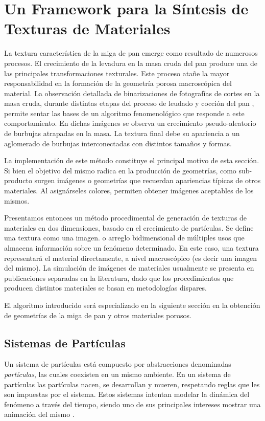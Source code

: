 \section[Síntesis de Texturas de Materiales]{Un Framework para la Síntesis de Texturas de Materiales}

La textura característica de la miga de pan emerge como resultado de numerosos procesos.
El crecimiento de la levadura en la masa cruda del pan produce una de las principales transformaciones texturales.
Este proceso atañe la mayor responsabilidad en la formación de la geometría porosa macroscópica del material.
La observación detallada de binarizaciones de fotografías de cortes en la masa cruda, durante distintas etapas del proceso de leudado y cocción del pan \cite{Scanlon2001}, permite sentar las bases de un algoritmo fenomenológico que responde a este comportamiento.
En dichas imágenes se observa un crecimiento pseudo-aleatorio de burbujas atrapadas en la masa.
La textura final debe su apariencia a un aglomerado de burbujas interconectadas con distintos tamaños y formas.

La implementación de este método constituye el principal motivo de esta sección.
Si bien el objetivo del mismo radica en la producción de geometrías, como sub-producto surgen imágenes o geometrías que recuerdan apariencias típicas de otros materiales.
Al asignárseles colores, permiten obtener imágenes aceptables de los mismos.

Presentamos entonces un método procedimental de generación de texturas de materiales en dos dimensiones, basado en el crecimiento de partículas.
Se define una textura como una imagen. o arreglo bidimensional de múltiples usos que almacena información sobre un fenómeno determinado.
En este caso, una textura representará el material directamente, a nivel macroscópico (es decir una imagen del mismo).
La simulación de imágenes de materiales usualmente se presenta en publicaciones separadas en la literatura, dado que los procedimientos que producen distintos materiales se basan en metodologías dispares.

El algoritmo introducido será especializado en la siguiente sección en la obtención de geometrías de la miga de pan y otros materiales porosos.

\subsection{Sistemas de Partículas}
Un sistema de partículas está compuesto por abstracciones denominadas {\em partículas}, las cuales coexisten en un mismo ambiente.
En un sistema de part\'iculas \cite{Reeves1983} las part\'iculas nacen, se desarrollan y mueren, respetando reglas que les son impuestas por el sistema. Estos sistemas intentan modelar la din\'amica del fen\'omeno a trav\'es del tiempo, siendo uno de sus principales intereses mostrar una animaci\'on del mismo \cite{Gao2010, Bagar2010, Lentine2010}.

